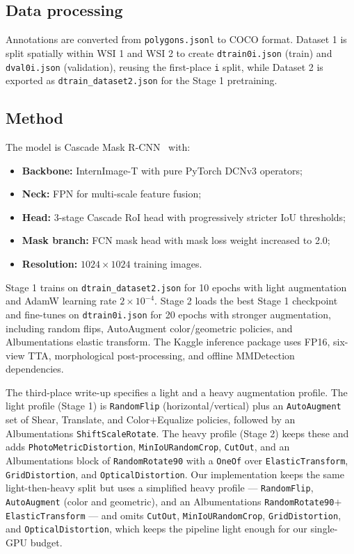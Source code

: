 \documentclass[12pt, a4paper]{article}
\begin{document}
\subsection{Data processing}

Annotations are converted from \texttt{polygons.jsonl} to COCO format. Dataset 1 is split spatially within WSI 1 and WSI 2 to create \texttt{dtrain0i.json} (train) and \texttt{dval0i.json} (validation), reusing the first-place \texttt{i} split, while Dataset 2 is exported as \texttt{dtrain\_\allowbreak dataset2.json} for the Stage 1 pretraining.

\subsection{Method}

The model is Cascade Mask R-CNN~\cite{cascade_rcnn} with:
\begin{itemize}
    \item \textbf{Backbone:} InternImage-T with pure PyTorch DCNv3 operators;
    \item \textbf{Neck:} FPN for multi-scale feature fusion;
    \item \textbf{Head:} 3-stage Cascade RoI head with progressively stricter IoU thresholds;
    \item \textbf{Mask branch:} FCN mask head with mask loss weight increased to 2.0;
    \item \textbf{Resolution:} $1024 \times 1024$ training images.
\end{itemize}

Stage 1 trains on \texttt{dtrain\_dataset2.json} for 10 epochs with light augmentation and AdamW learning rate $2 \times 10^{-4}$. Stage 2 loads the best Stage 1 checkpoint and fine-tunes on \texttt{dtrain0i.json} for 20 epochs with stronger augmentation, including random flips, AutoAugment color/geometric policies, and Albumentations elastic transform. The Kaggle inference package uses FP16, six-view TTA, morphological post-processing, and offline MMDetection dependencies.

The third-place write-up specifies a light and a heavy augmentation profile. The light profile (Stage 1) is \texttt{RandomFlip} (horizontal/vertical) plus an \texttt{AutoAugment} set of Shear, Translate, and Color$+$Equalize policies, followed by an Albumentations \texttt{ShiftScaleRotate}. The heavy profile (Stage 2) keeps these and adds \texttt{PhotoMetricDistortion}, \texttt{MinIoURandomCrop}, \texttt{CutOut}, and an Albumentations block of \texttt{RandomRotate90} with a \texttt{OneOf} over \texttt{ElasticTransform}, \texttt{GridDistortion}, and \texttt{OpticalDistortion}. Our implementation keeps the same light-then-heavy split but uses a simplified heavy profile --- \texttt{RandomFlip}, \texttt{AutoAugment} (color and geometric), and an Albumentations \texttt{RandomRotate90}$+$\texttt{ElasticTransform} --- and omits \texttt{CutOut}, \texttt{MinIoURandomCrop}, \texttt{GridDistortion}, and \texttt{OpticalDistortion}, which keeps the pipeline light enough for our single-GPU budget.
\end{document}
